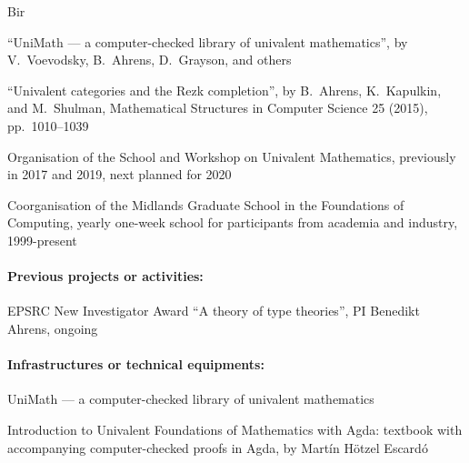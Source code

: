 \begin{sitedescription}{Bir}
\begin{compactitem}
 \item ``UniMath --- a computer-checked library of univalent mathematics'', by V.~Voevodsky, B.~Ahrens, D.~Grayson, and others
 \item ``Univalent categories and the Rezk completion'', by B.~Ahrens, K.~Kapulkin, and M.~Shulman, Mathematical Structures in Computer Science 25 (2015), pp.~1010--1039
 \item Organisation of the School and Workshop on Univalent Mathematics, previously in 2017 and 2019, next planned for 2020
 \item Coorganisation of the Midlands Graduate School in the Foundations of Computing,  yearly one-week school for participants from academia and industry, 1999-present
\end{compactitem}

\paragraph*{Previous projects or activities:}

\begin{compactitem}
 \item EPSRC New Investigator Award ``A theory of type theories'', PI Benedikt Ahrens, ongoing
\end{compactitem}

\paragraph*{Infrastructures or technical equipments:}
\begin{compactitem}
 \item UniMath --- a computer-checked library of univalent mathematics
 \item Introduction to Univalent Foundations of Mathematics with Agda: textbook with accompanying computer-checked proofs in Agda, by Martín Hötzel Escardó
\end{compactitem}


% 


\end{sitedescription}
